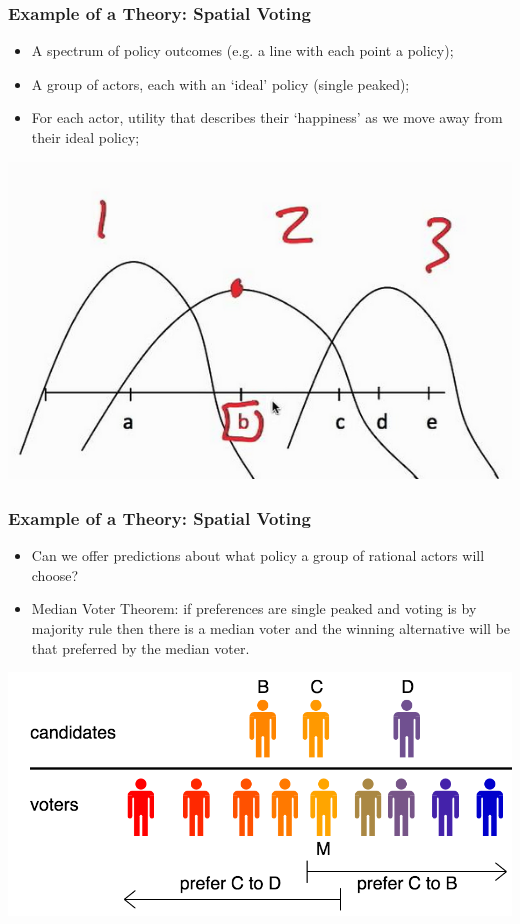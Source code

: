 \documentclass[aspectratio=169]{beamer}
\theoremstyle{principle}
\begin{document}
\begin{frame}
\frametitle{Example of a Theory: Spatial Voting}
\begin{itemize}
\item A spectrum of policy outcomes (e.g. a line with each point a policy);
\bigskip
\item A group of actors, each with an `ideal' policy (single peaked);
\bigskip
\item For each actor, utility that describes their `happiness' as we move away from their ideal policy;
\end{itemize}
    \begin{center}
     \includegraphics[scale=0.5]{sp.png}
     \end{center}
\end{frame}

\begin{frame}
\frametitle{Example of a Theory: Spatial Voting}
\begin{itemize}
\item Can we offer predictions about what policy a group of rational actors will choose?
\bigskip
\bigskip
\item Median Voter Theorem: if preferences are single peaked and voting is by majority rule then there is a median voter and the winning alternative will be that preferred by the median voter.
\end{itemize}
    \begin{center}
     \includegraphics[scale=0.25]{Median_voter.png}
     \end{center}
\end{frame}
\end{document}
